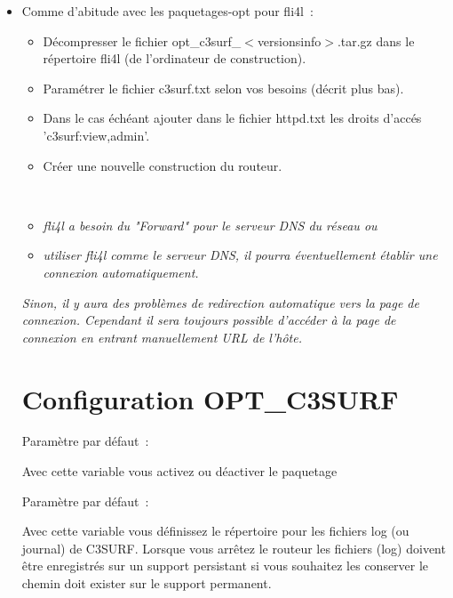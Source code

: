 \begin{itemize}
\item Comme d'abitude avec les paquetages-opt pour fli4l~:
  \begin{itemize}
	\item Décompresser le fichier opt\_c3surf\_$<$versionsinfo$>$.tar.gz dans
        le répertoire fli4l (de l'ordinateur de construction).
	\item Paramétrer le fichier c3surf.txt selon vos besoins (décrit plus bas).
	\item Dans le cas échéant ajouter dans le fichier httpd.txt
        les droits d'accés 'c3surf:view,admin'.
	\item Créer une nouvelle construction du routeur.\\
\end{itemize}
\\
          \begin{itemize}
                \item \emph{fli4l a besoin du "Forward" pour le serveur DNS du réseau ou}
                \item \emph{utiliser fli4l comme le serveur DNS, il pourra éventuellement
				établir une connexion automatiquement.}
          \end{itemize}

               \emph{Sinon, il y aura des problèmes de redirection automatique vers
               la page de connexion. Cependant il sera toujours possible d'accéder
               à la page de connexion en entrant manuellement URL de l'hôte.}

\section {Configuration OPT\_C3SURF}
\begin{description}


  Paramètre par défaut~: 

  Avec cette variable vous activez ou déactiver le paquetage


  Paramètre par défaut~: 

  Avec cette variable vous définissez le répertoire pour les fichiers
  log (ou journal) de C3SURF. Lorsque vous arrêtez le routeur les fichiers
  (log) doivent être enregistrés sur un support persistant si vous souhaitez
  les conserver le chemin doit exister sur le support permanent.


\end{description}
\end{itemize}
